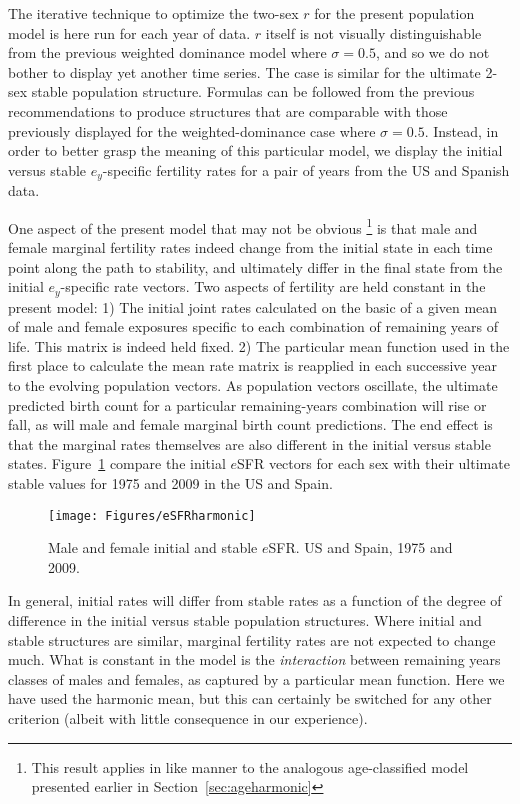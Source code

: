 
The iterative technique to optimize the two-sex $r$ for the present
population model is here run for each year of data. $r$ itself is not visually
distinguishable from the previous weighted dominance model where $\sigma = 0.5$,
and so we do not bother to display yet another time series. The case is similar
for the ultimate 2-sex stable population structure. Formulas can be followed
from the previous recommendations to produce structures that are comparable with
those previously displayed for the weighted-dominance case where $\sigma =
0.5$. Instead, in order to better grasp the meaning of this particular
model, we display the initial versus stable $e_y$-specific fertility rates for a
pair of years from the US and Spanish data.

One aspect of the present model that may not be obvious \footnote{This
result applies in like manner to the analogous age-classified model presented
earlier in Section~\ref{sec:ageharmonic}} is that male and female marginal
fertility rates indeed change from the initial state in each time point along
the path to stability, and ultimately differ in the final state from the initial
$e_y$-specific rate vectors. Two aspects of fertility are held constant in the
present model: 1) The initial joint rates calculated on the basic of a given
mean of male and female exposures specific to each combination of remaining
years of life. This matrix is indeed held fixed. 2) The particular mean function
used in the first place to calculate the mean rate matrix is reapplied in each
successive year to the evolving population vectors. As population vectors
oscillate, the ultimate predicted birth count for a particular remaining-years
combination will rise or fall, as will male and female marginal birth count
predictions. The end effect is that the marginal rates themselves are also
different in the initial versus stable states. Figure~\ref{fig:eSFRharmonic}
compare the initial $e$SFR vectors for each sex with their ultimate stable
values for 1975 and 2009 in the US and Spain.

\begin{figure}[ht!]
        \centering  
          \caption{Male and female initial and stable $e$SFR. US and
          Spain, 1975 and 2009.}
           \texttt{[image: Figures/eSFRharmonic]}
          \label{fig:eSFRharmonic}
\end{figure}

In general, initial rates will differ from stable rates as a function of the
degree of difference in the initial versus stable population structures. Where
initial and stable structures are similar, marginal fertility rates are not
expected to change much. What is constant in the model is the
\textit{interaction} between remaining years classes of males and females, as
captured by a particular mean function. Here we have used the harmonic mean, but
this can certainly be switched for any other criterion (albeit with little
consequence in our experience).













